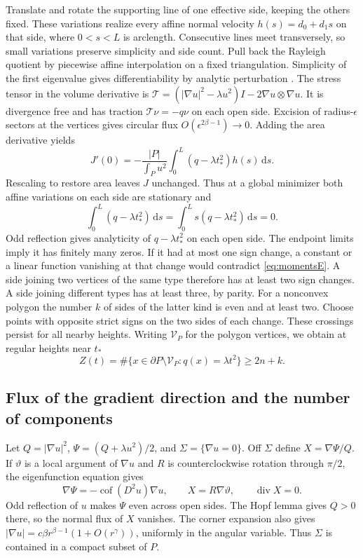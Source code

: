 \documentclass[11pt,a4paper,reqno]{amsart}
\theoremstyle{remark}
\numberwithin{equation}{section}
\newcommand{\dd}{\,\mathrm d}
\begin{document}
Translate and rotate the supporting line of one effective side, keeping the
others fixed. These variations realize every affine normal velocity
$h(s)=d_0+d_1s$ on that side, where $0<s<L$ is arclength. Consecutive lines
meet transversely, so small variations preserve simplicity and side count.
Pull back the Rayleigh quotient by piecewise affine interpolation on a
fixed triangulation. Simplicity of the first eigenvalue gives differentiability
by analytic perturbation \cite{kato}. The stress tensor in the volume
derivative is $\mathcal T=(|\nabla u|^2-\lambda u^2)I-2\nabla u\otimes\nabla u$.
It is divergence free and has traction $\mathcal T\nu=-q\nu$ on each open
side. Excision of radius-$\epsilon$ sectors at the vertices gives circular
flux $O(\epsilon^{2\beta-1})\to0$. Adding the area derivative yields
\[
 J'(0)=-\frac{|P|}{\int_P u^2}\int_0^L(q-\lambda t_*^2)h(s)\dd s .
\]
Rescaling to restore area leaves $J$ unchanged. Thus at a global minimizer
both affine variations on each side are stationary and
\begin{equation}\label{eq:momentsE}
       \int_0^L(q-\lambda t_*^2)\dd s=\int_0^L s(q-\lambda t_*^2)\dd s=0 .
\end{equation}
Odd reflection gives analyticity of $q-\lambda t_*^2$ on each open side.
The endpoint limits imply it has finitely many zeros. If it had at most one
sign change, a constant or a linear function vanishing at that change would
contradict \eqref{eq:momentsE}. A side joining two vertices of the same type
therefore has at least two sign changes. A side joining different types has
at least three, by parity. For a nonconvex polygon the number $k$ of sides
of the latter kind is even and at least two. Choose points with opposite
strict signs on the two sides of each change. These crossings persist for
all nearby heights. Writing $\mathcal V_P$ for the polygon vertices, we obtain at regular heights near $t_*$
\begin{equation}\label{eq:countlow}
 Z(t)=\#\{x\in\partial P\setminus\mathcal V_P:q(x)=\lambda t^2\}\ge 2n+k .
\end{equation}

\subsection{Flux of the gradient direction and the number of components}
Let $Q=|\nabla u|^2$, $\Psi=(Q+\lambda u^2)/2$, and $\Sigma=\{\nabla u=0\}$.
Off $\Sigma$ define $X=\nabla\Psi/Q$. If $\vartheta$ is a local argument
of $\nabla u$ and $R$ is counterclockwise rotation through $\pi/2$, the
eigenfunction equation gives
\begin{equation}\label{eq:flux-identity}
 \nabla\Psi=-\operatorname{cof}(D^2u)\nabla u,\qquad
 X=R\nabla\vartheta,\qquad \operatorname{div}X=0 .
\end{equation}
Odd reflection of $u$ makes $\Psi$ even across open sides. The Hopf lemma
gives $Q>0$ there, so the normal flux of $X$ vanishes. The corner expansion
also gives $|\nabla u|=c\beta r^{\beta-1}(1+O(r^\gamma))$, uniformly in
the angular variable. Thus $\Sigma$ is contained in a compact subset of $P$.
\end{document}

